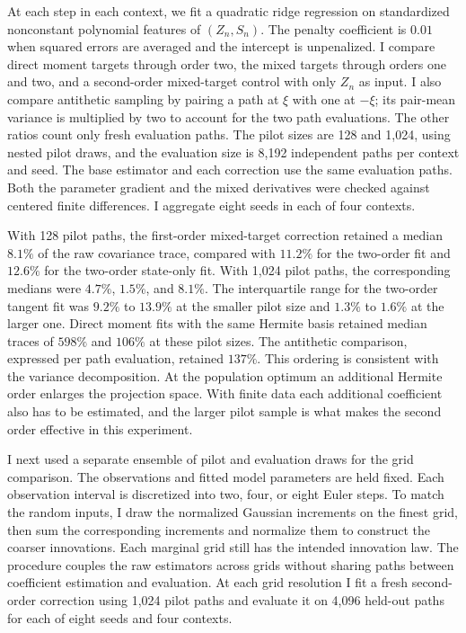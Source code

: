 \documentclass[12pt]{article}
\begin{document}
At each step in each context, we fit a quadratic ridge regression on standardized nonconstant polynomial features of \((Z_n,S_n)\). The penalty coefficient is \(0.01\) when squared errors are averaged and the intercept is unpenalized. I compare direct moment targets through order two, the mixed targets through orders one and two, and a second-order mixed-target control with only \(Z_n\) as input. I also compare antithetic sampling by pairing a path at \(\xi\) with one at \(-\xi\); its pair-mean variance is multiplied by two to account for the two path evaluations. The other ratios count only fresh evaluation paths. The pilot sizes are 128 and 1,024, using nested pilot draws, and the evaluation size is 8,192 independent paths per context and seed. The base estimator and each correction use the same evaluation paths. Both the parameter gradient and the mixed derivatives were checked against centered finite differences. I aggregate eight seeds in each of four contexts.

With 128 pilot paths, the first-order mixed-target correction retained a median \(8.1\%\) of the raw covariance trace, compared with \(11.2\%\) for the two-order fit and \(12.6\%\) for the two-order state-only fit. With 1,024 pilot paths, the corresponding medians were \(4.7\%\), \(1.5\%\), and \(8.1\%\). The interquartile range for the two-order tangent fit was \(9.2\%\) to \(13.9\%\) at the smaller pilot size and \(1.3\%\) to \(1.6\%\) at the larger one. Direct moment fits with the same Hermite basis retained median traces of \(598\%\) and \(106\%\) at these pilot sizes. The antithetic comparison, expressed per path evaluation, retained \(137\%\). This ordering is consistent with the variance decomposition. At the population optimum an additional Hermite order enlarges the projection space. With finite data each additional coefficient also has to be estimated, and the larger pilot sample is what makes the second order effective in this experiment.

I next used a separate ensemble of pilot and evaluation draws for the grid comparison. The observations and fitted model parameters are held fixed. Each observation interval is discretized into two, four, or eight Euler steps. To match the random inputs, I draw the normalized Gaussian increments on the finest grid, then sum the corresponding increments and normalize them to construct the coarser innovations. Each marginal grid still has the intended innovation law. The procedure couples the raw estimators across grids without sharing paths between coefficient estimation and evaluation. At each grid resolution I fit a fresh second-order correction using 1,024 pilot paths and evaluate it on 4,096 held-out paths for each of eight seeds and four contexts.
\end{document}
